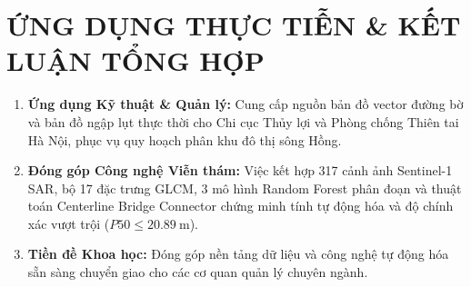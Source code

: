 \documentclass[11pt,a4paper]{article}
\begin{document}
\section{ỨNG DỤNG THỰC TIỄN \& KẾT LUẬN TỔNG HỢP}

\begin{enumerate}
    \item \textbf{Ứng dụng Kỹ thuật \& Quản lý:} Cung cấp nguồn bản đồ vector đường bờ và bản đồ ngập lụt thực thời cho Chi cục Thủy lợi và Phòng chống Thiên tai Hà Nội, phục vụ quy hoạch phân khu đô thị sông Hồng.
    \item \textbf{Đóng góp Công nghệ Viễn thám:} Việc kết hợp 317 cảnh ảnh Sentinel-1 SAR, bộ 17 đặc trưng GLCM, 3 mô hình Random Forest phân đoạn và thuật toán Centerline Bridge Connector chứng minh tính tự động hóa và độ chính xác vượt trội ($P50 \le 20.89~\text{m}$).
    \item \textbf{Tiền đề Khoa học:} Đóng góp nền tảng dữ liệu và công nghệ tự động hóa sẵn sàng chuyển giao cho các cơ quan quản lý chuyên ngành.
\end{enumerate}
\end{document}
